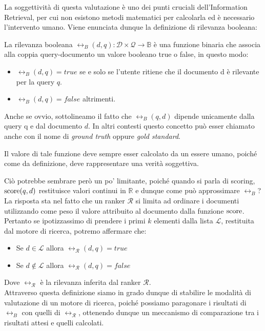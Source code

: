 La soggettività di questa valutazione è uno dei punti cruciali dell'Information Retrieval, per cui non esistono
metodi matematici per calcolarla ed è necessario l'intervento umano.
Viene enunciata dunque la definizione di rilevanza booleana:

\begin{definizione}\label{def:relb}
	La rilevanza booleana $\rel_B(d,q): \mathcal{D} \times \mathcal{Q} \rightarrow \mathbb{B}$
	è una funzione binaria che associa alla coppia query-documento un valore booleano
	true o false, in questo modo:
	\begin{itemize}
		\item		$\rel_B(d,q) = true$ se e solo se l'utente ritiene che il documento d è rilevante
		per la query $q$.
		\item $\rel_B(d,q) = false$ altrimenti.
	\end{itemize}
	
	Anche se ovvio, sottolineamo il fatto che $\rel_B(q,d)$ dipende unicamente dalla query q e
	dal documento $d$. In altri contesti questo concetto può esser chiamato anche con il nome
	di \textit{ground truth} oppure \textit{gold standard}.
\end{definizione}

Il valore di tale funzione deve sempre esser calcolato da un essere umano, poiché come da definizione, 
deve rappresentare una verità soggettiva.

Ciò potrebbe sembrare però un po' limitante, poiché quando si parla di scoring,
$\text{score}(q,d)$ restituisce valori continui in $\mathbb{R}$ e dunque come può
approssimare $\rel_B$?
La risposta sta nel fatto che un ranker $\mathcal{R}$ si limita ad ordinare i documenti utilizzando come peso
il valore attribuito al documento dalla funzione $\text{score}$. Pertanto se ipotizzassimo di prendere
i primi $k$ elementi dalla lista $\mathcal{L}$, restituita dal motore di ricerca, potremo affermare che:

\begin{itemize}
	\item Se $d \in \mathcal{L}$  allora $\rel_{\mathcal{R}}(d, q) = true$
	\item Se $d \notin \mathcal{L}$ allora $\rel_{\mathcal{R}}(d,q) = false$
\end{itemize}

Dove $\rel_{\mathcal{R}}$ è la rilevanza inferita dal ranker $\mathcal{R}$.
\\

Attraverso questa definizione siamo in grado dunque di stabilire le modalità di valutazione di
un motore di ricerca, poiché possiamo paragonare i risultati di $\rel_B$ con quelli di $\rel_{\mathcal{R}}$,
ottenendo dunque un meccanismo di comparazione tra i risultati attesi e quelli calcolati.

